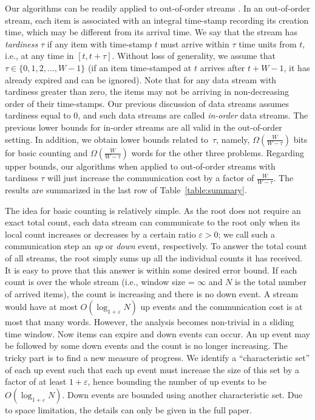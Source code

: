 \documentclass[proceedings]{stacs}
\theoremstyle{definition}\newtheorem{fact}{Fact}
\begin{document}
Our algorithms can be readily applied
to out-of-order streams \cite{BuschT07,CormodeKT08}.
 {In an out-of-order stream, each item is associated
  with an integral time-stamp recording its creation time, which may
  be different from its arrival time.
We say that the stream has \emph{tardiness} $\tau$ if
any item with time-stamp $t$ must arrive within $\tau$ time
units from $t$, i.e., at any time in $[t, t+ \tau]$.
Without loss of generality, we assume that $\tau \in \{0, 1, 2,\dots,
W-1\}$ (if an item time-stamped at $t$ arrives after $t + W-1$,
it has already expired and can be ignored).
Note that for any data stream with tardiness greater than zero, the
items may not be arriving in non-decreasing order of their time-stamps.
Our previous discussion of
data streams assumes tardiness equal to $0$, and
such data streams are called \emph{in-order} data streams.}
The previous lower bounds for in-order streams are all valid
in the out-of-order setting. In addition,
we obtain lower bounds related to~$\tau$,
namely, $\Omega(\frac{W}{W-\tau})$ bits for basic counting and
$\Omega(\frac{W}{W-\tau})$ words for the other three problems.
Regarding upper bounds,
our algorithms when applied to
out-of-order streams with tardiness $\tau$ will just
increase the communication
cost by a factor of $\frac{W}{W-\tau}$.
The results are summarized in the last row of Table~\ref{table:summary}.






\vspace{0.5ex}
The idea for basic counting is relatively simple.
As the root does not require an exact total count, each data
stream can communicate to the root only when its local count
increases or decreases by a certain ratio $\varepsilon > 0$; we call such a
communication step an \emph{up} or \emph{down} event, respectively.
To answer the total count of all streams, the root simply sums up
all the individual counts it has received. It is easy to prove that
this answer is within some desired error bound.
If each count is over the whole stream (i.e., window size = $\infty$
and   {$N$ is the total number of arrived items}),
the count is increasing and there is no down event.
A stream would have at most $O(\log_{1+\varepsilon}N)$ up events
and the communication cost is at most that many words.
However, the analysis becomes non-trivial in a sliding time window.
Now items can expire and down events can occur.
An up event may be followed by some
down events and the count is no longer increasing.
The tricky part is to find a new measure of progress.
We identify a ``characteristic set''
of each up event such that
each up event must increase the size of
this set by a factor of at least $1+\varepsilon$,
hence bounding the number of up events to be $O(\log_{1+\varepsilon} N)$.
Down events are bounded using another characteristic set.
Due to space limitation, the details can only be given in the full paper.
\end{document}
